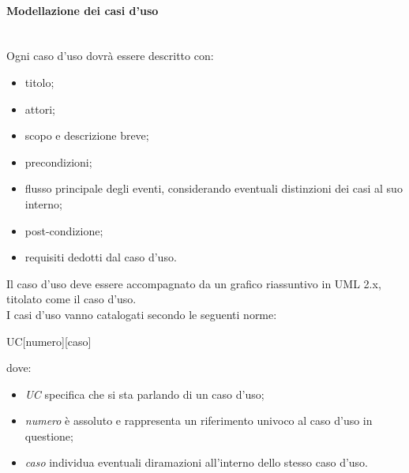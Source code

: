 \paragraph{Modellazione dei casi d'uso}\mbox{}\\
Ogni caso d'uso dovrà essere descritto con:
\begin{itemize}
	\item titolo;
	\item attori;
	\item scopo e descrizione breve;
	\item precondizioni;
	\item flusso principale degli eventi, considerando eventuali distinzioni dei casi al suo interno;
	\item post-condizione;
	\item requisiti dedotti dal caso d'uso.
\end{itemize}
Il caso d'uso deve essere accompagnato da un grafico riassuntivo in UML 2.x, titolato come il caso d'uso.\\
I casi d'uso vanno catalogati secondo le seguenti norme:
\begin{center}
	UC[numero][caso]
\end{center}
dove:
\begin{itemize}
	\item \textit{UC} specifica che si sta parlando di un caso d'uso;
	\item \textit{numero} è assoluto e rappresenta un riferimento univoco al caso d'uso in questione;
	\item \textit{caso} individua eventuali diramazioni all'interno dello stesso caso d’uso.
\end{itemize}


